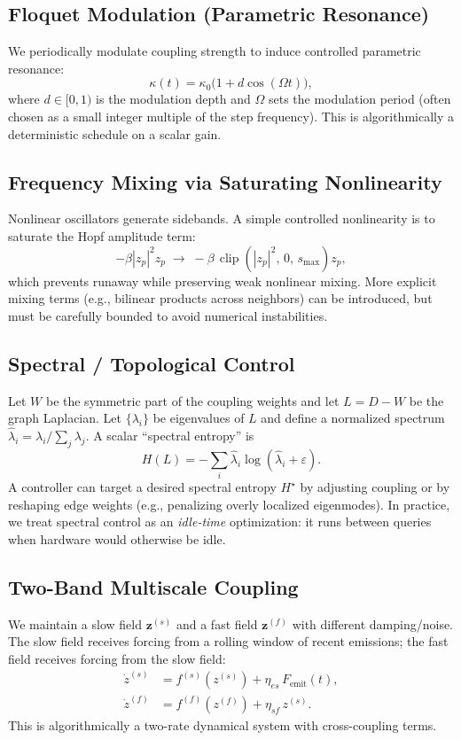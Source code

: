\documentclass[11pt,a4paper]{article}
\newcommand{\eps}{\varepsilon}
\newcommand{\z}{z}                %
\newcommand{\zvec}{\bm{z}}
\newcommand{\force}{F}
\newcommand{\coupling}{\kappa}
\begin{document}
\subsection{Floquet Modulation (Parametric Resonance)}
We periodically modulate coupling strength to induce controlled parametric resonance:
\begin{equation}
\coupling(t) = \coupling_0\bigl(1 + d\cos(\Omega t)\bigr),
\end{equation}
where $d\in[0,1)$ is the modulation depth and $\Omega$ sets the modulation period (often chosen as a small integer multiple of the step frequency). This is algorithmically a deterministic schedule on a scalar gain.

\subsection{Frequency Mixing via Saturating Nonlinearity}
Nonlinear oscillators generate sidebands. A simple controlled nonlinearity is to saturate the Hopf amplitude term:
\begin{equation}
-\beta |\z_p|^2 \z_p \;\longrightarrow\; -\beta\,\operatorname{clip}\!\left(|\z_p|^2,\,0,\,s_{\max}\right)\z_p,
\end{equation}
which prevents runaway while preserving weak nonlinear mixing. More explicit mixing terms (e.g., bilinear products across neighbors) can be introduced, but must be carefully bounded to avoid numerical instabilities.

\subsection{Spectral / Topological Control}
Let $W$ be the symmetric part of the coupling weights and let $L=D-W$ be the graph Laplacian. Let $\{\lambda_i\}$ be eigenvalues of $L$ and define a normalized spectrum $\hat{\lambda}_i=\lambda_i/\sum_j\lambda_j$. A scalar ``spectral entropy'' is
\begin{equation}
H(L)= -\sum_i \hat{\lambda}_i \log(\hat{\lambda}_i+\eps).
\end{equation}
A controller can target a desired spectral entropy $H^\star$ by adjusting coupling or by reshaping edge weights (e.g., penalizing overly localized eigenmodes). In practice, we treat spectral control as an \emph{idle-time} optimization: it runs between queries when hardware would otherwise be idle.

\subsection{Two-Band Multiscale Coupling}
We maintain a slow field $\zvec^{(s)}$ and a fast field $\zvec^{(f)}$ with different damping/noise. The slow field receives forcing from a rolling window of recent emissions; the fast field receives forcing from the slow field:
\begin{align}
\dot{\z}^{(s)} &= f^{(s)}(\z^{(s)}) + \eta_{es}\,\force_{\text{emit}}(t),\\
\dot{\z}^{(f)} &= f^{(f)}(\z^{(f)}) + \eta_{sf}\,\z^{(s)}.
\end{align}
This is algorithmically a two-rate dynamical system with cross-coupling terms.
\end{document}
